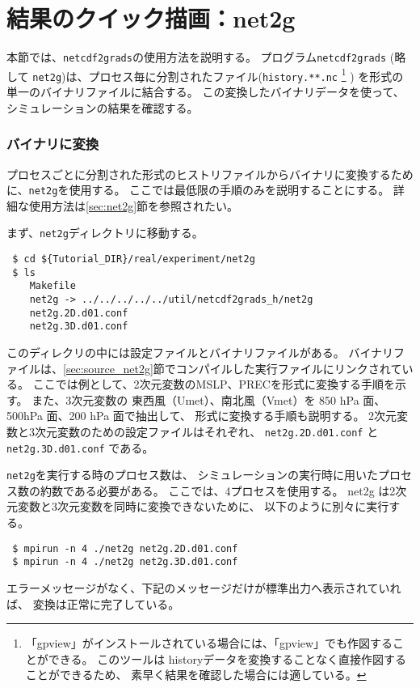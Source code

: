 \section{結果のクイック描画：net2g} \label{sec:quicklook}

本節では、\verb|netcdf2grads|の使用方法を説明する。
プログラム\verb|netcdf2grads| (略して \verb|net2g|)は、プロセス毎に分割された{\netcdf}ファイル(\verb|history.**.nc|
\footnote{「gpview」がインストールされている場合には、「gpview」でも作図することができる。
このツールは historyデータを変換することなく直接作図することができるため、
素早く結果を確認した場合には適している。
}
)
を{\grads}形式の単一のバイナリファイルに結合する。
この変換した{\grads}バイナリデータを使って、シミュレーションの結果を確認する。


\subsubsection{{\grads}バイナリに変換}
プロセスごとに分割された{\netcdf}形式のヒストリファイルから{\grads}バイナリに変換するために、\verb|net2g|を使用する。
ここでは最低限の手順のみを説明することにする。
詳細な使用方法は\ref{sec:net2g}節を参照されたい。

まず、\verb|net2g|ディレクトリに移動する。
\begin{verbatim}
 $ cd ${Tutorial_DIR}/real/experiment/net2g
 $ ls
    Makefile
    net2g -> ../../../../../util/netcdf2grads_h/net2g
    net2g.2D.d01.conf
    net2g.3D.d01.conf
\end{verbatim}
このディレクリの中には設定ファイルとバイナリファイルがある。
バイナリファイルは、\ref{sec:source_net2g}節でコンパイルした実行ファイルにリンクされている。
ここでは例として、2次元変数のMSLP、PRECを{\grads}形式に変換する手順を示す。
また、3次元変数の 東西風（Umet）、南北風（Vmet）を 850 hPa 面、500hPa 面、200 hPa 面で抽出して、
{\grads}形式に変換する手順も説明する。
2次元変数と3次元変数のための設定ファイルはそれぞれ、
\verb|net2g.2D.d01.conf| と \verb|net2g.3D.d01.conf| である。

\verb|net2g|を実行する時のプロセス数は、
シミュレーションの実行時に用いたプロセス数の約数である必要がある。
ここでは、4プロセスを使用する。
net2g は2次元変数と3次元変数を同時に変換できないために、
以下のように別々に実行する。
\begin{verbatim}
 $ mpirun -n 4 ./net2g net2g.2D.d01.conf
 $ mpirun -n 4 ./net2g net2g.3D.d01.conf
\end{verbatim}
エラーメッセージがなく、下記のメッセージだけが標準出力へ表示されていれば、
変換は正常に完了している。\\

